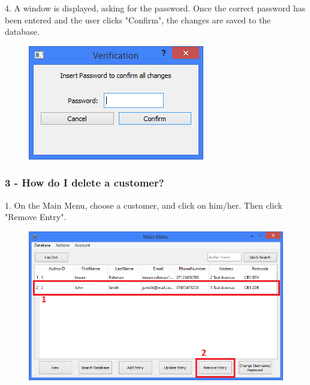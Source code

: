 4. A window is displayed, asking for the password. Once the correct password has been entered and the user clicks "Confirm", the changes are saved to the database.

\begin{figure}[H]
    \includegraphics[width=\textwidth]{./Manual/Tutorial/Q2/Verification.png}
\end{figure}

\subsubsection{3 -  How do I delete a customer?}

1. On the Main Menu, choose a customer, and click on him/her. Then click "Remove Entry".

\begin{figure}[H]
    \includegraphics[width=\textwidth]{./Manual/Tutorial/Q3/SelectingCustomer.png}
\end{figure}

